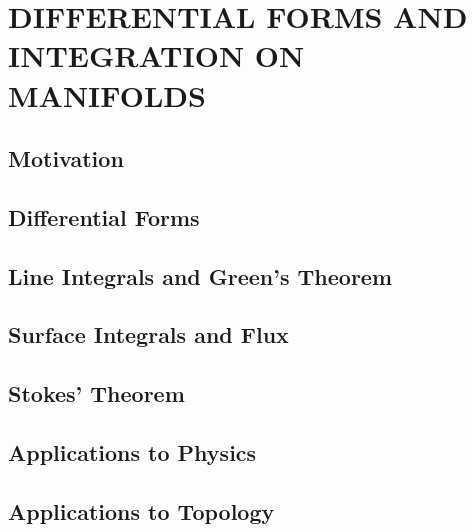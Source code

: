 \section{DIFFERENTIAL FORMS AND INTEGRATION ON MANIFOLDS}
\subsection{Motivation}
\subsection{Differential Forms}
\subsection{Line Integrals and Green's Theorem}
\subsection{Surface Integrals and Flux}
\subsection{Stokes' Theorem}
\subsection{Applications to Physics}
\subsection{Applications to Topology}
